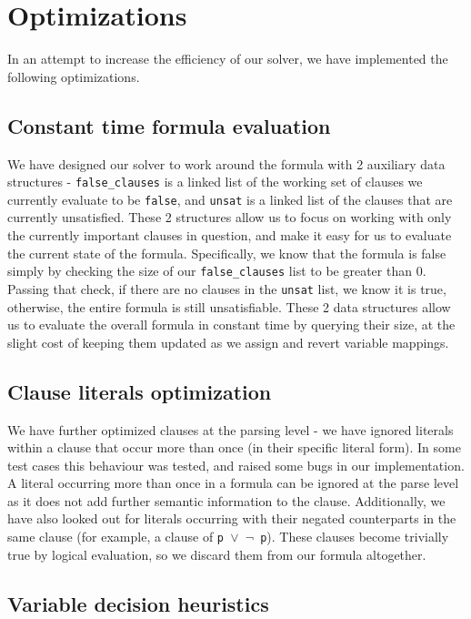 \documentclass[a4paper]{article}
\begin{document}
\section{Optimizations}

In an attempt to increase the efficiency of our solver, we have implemented the following optimizations.

\subsection{Constant time formula evaluation}

We have designed our solver to work around the formula with 2 auxiliary data structures -  \texttt{false\_clauses} is a linked list of the working set of clauses we currently evaluate to be \texttt{false}, and \texttt{unsat} is a linked list of the clauses that are currently unsatisfied. These 2 structures allow us to focus on working with only the currently important clauses in question, and make it easy for us to evaluate the current state of the formula. Specifically, we know that the formula is false simply by checking the size of our \texttt{false\_clauses} list to be greater than 0. Passing that check, if there are no clauses in the \texttt{unsat} list, we know it is true, otherwise, the entire formula is still unsatisfiable. These 2 data structures allow us to evaluate the overall formula in constant time by querying their size, at the slight cost of keeping them updated as we assign and revert variable mappings.

\subsection{Clause literals optimization}
We have further optimized clauses at the parsing level - we have ignored literals within a clause that occur more than once (in their specific literal form). In some test cases this behaviour was tested, and raised some bugs in our implementation. A literal occurring more than once in a formula can be ignored at the parse level as it does not add further semantic information to the clause. Additionally, we have also looked out for literals occurring with their negated counterparts in the same clause (for example, a clause of \texttt{p $\vee$ $\neg$ p}). These clauses become trivially true by logical evaluation, so we discard them from our formula altogether.


\subsection{Variable decision heuristics}
\end{document}
